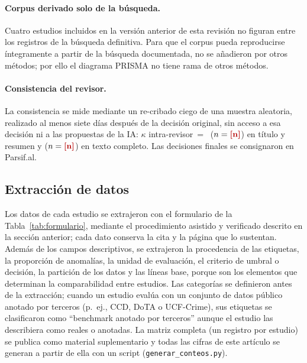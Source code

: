\documentclass[12pt, a4paper]{article}
\begin{document}
\paragraph{Corpus derivado solo de la búsqueda.} Cuatro estudios incluidos en la versión anterior de esta revisión no figuran entre los registros de la búsqueda definitiva. Para que el corpus pueda reproducirse íntegramente a partir de la búsqueda documentada, no se añadieron por otros métodos; por ello el diagrama PRISMA no tiene rama de otros métodos.

\paragraph{Consistencia del revisor.} La consistencia se mide mediante un re-cribado ciego de una muestra aleatoria, realizado al menos siete días después de la decisión original, sin acceso a esa decisión ni a las propuestas de la IA: $\kappa$ intra-revisor~=~\KappaRecribadoTA{} ($n=\NRecribadoTA$) en título y resumen y \KappaRecribadoTC{} ($n=\NRecribadoTC$) en texto completo. Las decisiones finales se consignaron en Parsif.al.

\subsection{Extracción de datos}

Los datos de cada estudio se extrajeron con el formulario de la Tabla~\ref{tab:formulario}, mediante el procedimiento asistido y verificado descrito en la sección anterior; cada dato conserva la cita y la página que lo sustentan. Además de los campos descriptivos, se extrajeron la procedencia de las etiquetas, la proporción de anomalías, la unidad de evaluación, el criterio de umbral o decisión, la partición de los datos y las líneas base, porque son los elementos que determinan la comparabilidad entre estudios. Las categorías se definieron antes de la extracción; cuando un estudio evalúa con un conjunto de datos público anotado por terceros (p.~ej., CCD, DoTA o UCF-Crime), sus etiquetas se clasificaron como ``benchmark anotado por terceros'' aunque el estudio las describiera como reales o anotadas. La matriz completa (un registro por estudio) se publica como material suplementario y todas las cifras de este artículo se generan a partir de ella con un script (\texttt{generar\_conteos.py}).
\end{document}
